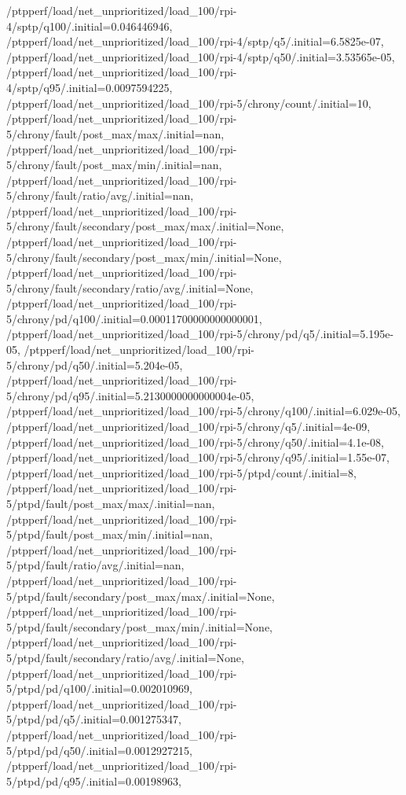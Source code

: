 {    /ptpperf/load/net_unprioritized/load_100/rpi-4/sptp/q100/.initial=0.046446946,
    /ptpperf/load/net_unprioritized/load_100/rpi-4/sptp/q5/.initial=6.5825e-07,
    /ptpperf/load/net_unprioritized/load_100/rpi-4/sptp/q50/.initial=3.53565e-05,
    /ptpperf/load/net_unprioritized/load_100/rpi-4/sptp/q95/.initial=0.0097594225,
    /ptpperf/load/net_unprioritized/load_100/rpi-5/chrony/count/.initial=10,
    /ptpperf/load/net_unprioritized/load_100/rpi-5/chrony/fault/post_max/max/.initial=nan,
    /ptpperf/load/net_unprioritized/load_100/rpi-5/chrony/fault/post_max/min/.initial=nan,
    /ptpperf/load/net_unprioritized/load_100/rpi-5/chrony/fault/ratio/avg/.initial=nan,
    /ptpperf/load/net_unprioritized/load_100/rpi-5/chrony/fault/secondary/post_max/max/.initial=None,
    /ptpperf/load/net_unprioritized/load_100/rpi-5/chrony/fault/secondary/post_max/min/.initial=None,
    /ptpperf/load/net_unprioritized/load_100/rpi-5/chrony/fault/secondary/ratio/avg/.initial=None,
    /ptpperf/load/net_unprioritized/load_100/rpi-5/chrony/pd/q100/.initial=0.00011700000000000001,
    /ptpperf/load/net_unprioritized/load_100/rpi-5/chrony/pd/q5/.initial=5.195e-05,
    /ptpperf/load/net_unprioritized/load_100/rpi-5/chrony/pd/q50/.initial=5.204e-05,
    /ptpperf/load/net_unprioritized/load_100/rpi-5/chrony/pd/q95/.initial=5.2130000000000004e-05,
    /ptpperf/load/net_unprioritized/load_100/rpi-5/chrony/q100/.initial=6.029e-05,
    /ptpperf/load/net_unprioritized/load_100/rpi-5/chrony/q5/.initial=4e-09,
    /ptpperf/load/net_unprioritized/load_100/rpi-5/chrony/q50/.initial=4.1e-08,
    /ptpperf/load/net_unprioritized/load_100/rpi-5/chrony/q95/.initial=1.55e-07,
    /ptpperf/load/net_unprioritized/load_100/rpi-5/ptpd/count/.initial=8,
    /ptpperf/load/net_unprioritized/load_100/rpi-5/ptpd/fault/post_max/max/.initial=nan,
    /ptpperf/load/net_unprioritized/load_100/rpi-5/ptpd/fault/post_max/min/.initial=nan,
    /ptpperf/load/net_unprioritized/load_100/rpi-5/ptpd/fault/ratio/avg/.initial=nan,
    /ptpperf/load/net_unprioritized/load_100/rpi-5/ptpd/fault/secondary/post_max/max/.initial=None,
    /ptpperf/load/net_unprioritized/load_100/rpi-5/ptpd/fault/secondary/post_max/min/.initial=None,
    /ptpperf/load/net_unprioritized/load_100/rpi-5/ptpd/fault/secondary/ratio/avg/.initial=None,
    /ptpperf/load/net_unprioritized/load_100/rpi-5/ptpd/pd/q100/.initial=0.002010969,
    /ptpperf/load/net_unprioritized/load_100/rpi-5/ptpd/pd/q5/.initial=0.001275347,
    /ptpperf/load/net_unprioritized/load_100/rpi-5/ptpd/pd/q50/.initial=0.0012927215,
    /ptpperf/load/net_unprioritized/load_100/rpi-5/ptpd/pd/q95/.initial=0.00198963,
}
